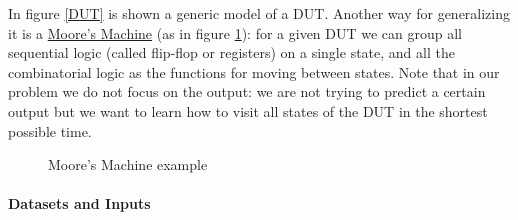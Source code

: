 \documentclass{article}
\begin{document}
In figure \ref{DUT} is shown a generic model of a DUT. Another way for generalizing it is a \href{https://en.wikipedia.org/wiki/Moore_machine}{Moore's Machine} (as in figure \ref{moore}): for a given DUT we can group all sequential logic (called flip-flop or registers) on a single state, and all the combinatorial logic as the functions for moving between states. Note that in our problem we do not focus on the output: we are not trying to predict a certain output but we want to learn how to visit all states of the DUT in the shortest possible time.
\begin{figure}
\begin{center}
\caption{Moore's Machine example}
\label{moore}
\end{center}
\end{figure}

\paragraph{Datasets and Inputs}

\end{document}

